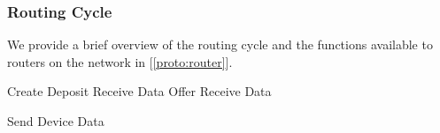 \documentclass[UTF8, 10pt, nonatbib, nocopyrightspace, reprint]{sigplanconf}
\newenvironment{protocol}[2]{
  \begin{algorithm}[!htb]
    \DontPrintSemicolon
    \caption{#1}\label{#2}
}{
  \end{algorithm}
  \FloatBarrier
}
\newcommand{\protoref}[1]{[\autoref{#1}]}
\begin{document}
\subsubsection{Routing Cycle}\label{cycle:router}

We provide a brief overview of the routing cycle and the functions available to routers on the network in \protoref{proto:router}.

\begin{protocol}{Router Protocol Overview}{proto:router}

   {
    Create Deposit
    Receive Data Offer \;
    Receive Data \;
  }

   {
    Send Device Data \;
  }
\end{protocol}
\end{document}
